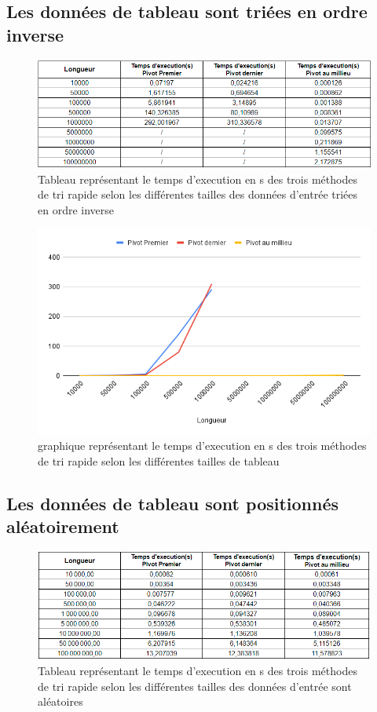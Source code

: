 \subsection{Les données de tableau sont triées en ordre inverse }
\begin{figure}[H]
    \centering
        \includegraphics[scale=0.7]{ressources/invT.PNG}
        \caption{Tableau représentant le temps d'execution en s des trois méthodes de tri rapide selon les différentes tailles des données d'entrée triées en ordre inverse}
    \label{fig:fusion}
\end{figure}

\begin{figure}[H]
    \centering
        \includegraphics[scale=0.7]{ressources/inv.png}
        \caption{graphique représentant le temps d'execution en s des trois méthodes de tri rapide selon les différentes tailles de tableau}
    \label{fig:fusion}
\end{figure}

\subsection{Les données de tableau sont positionnés aléatoirement}
\begin{figure}[H]
    \centering
        \includegraphics[scale=0.7]{ressources/randT.PNG}
        \caption{Tableau représentant le temps d'execution en s des trois méthodes de tri rapide selon les différentes tailles des données d'entrée sont aléatoires}
    \label{fig:fusion}
\end{figure}

